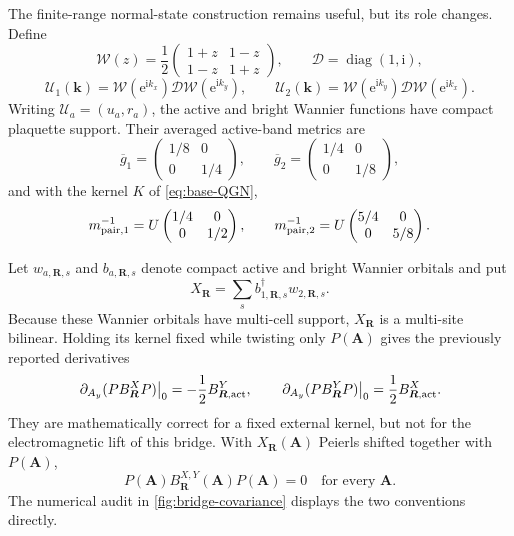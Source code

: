 \documentclass[11pt]{article}
\theoremstyle{remark}
\newcommand{\I}{\mathrm i}
\newcommand{\e}{\mathrm e}
\newcommand{\bmk}{\bm k}
\begin{document}
The finite-range normal-state construction remains useful, but its role changes.  Define
\begin{equation}
 \mathcal W(z)=\frac12
 \begin{pmatrix}1+z&1-z\\1-z&1+z\end{pmatrix},
 \qquad
 \mathcal D=\operatorname{diag}(1,\I),
\end{equation}
\begin{equation}
 \mathcal U_1(\bmk)=\mathcal W(\e^{\I k_x})\mathcal D\mathcal W(\e^{\I k_y}),
 \qquad
 \mathcal U_2(\bmk)=\mathcal W(\e^{\I k_y})\mathcal D\mathcal W(\e^{\I k_x}).
 \label{eq:compact-frames-revised}
\end{equation}
Writing $\mathcal U_a=(u_a,r_a)$, the active and bright Wannier functions have compact plaquette support.  Their averaged active-band metrics are
\begin{equation}
 \overline g_1=\begin{pmatrix}1/8&0\\0&1/4\end{pmatrix},
 \qquad
 \overline g_2=\begin{pmatrix}1/4&0\\0&1/8\end{pmatrix},
\end{equation}
and with the kernel $K$ of \cref{eq:base-QGN},
\begin{equation}
 m_{{\rm pair},1}^{-1}=U\begin{pmatrix}1/4&0\\0&1/2\end{pmatrix},
 \qquad
 m_{{\rm pair},2}^{-1}=U\begin{pmatrix}5/4&0\\0&5/8\end{pmatrix}.
 \label{eq:compact-masses-revised}
\end{equation}

Let $w_{a,\bm R,s}$ and $b_{a,\bm R,s}$ denote compact active and bright Wannier orbitals and put
\begin{equation}
 X_{\bm R}=\sum_s b_{1,\bm R,s}^\dagger w_{2,\bm R,s}.
\end{equation}
Because these Wannier orbitals have multi-cell support, $X_{\bm R}$ is a multi-site bilinear.  Holding its kernel fixed while twisting only $P(\bm A)$ gives the previously reported derivatives
\begin{equation}
 \left.\partial_{A_y}(PB_{\bm R}^XP)\right|_0=-\frac12B_{{\bm R},{\rm act}}^Y,
 \qquad
 \left.\partial_{A_y}(PB_{\bm R}^YP)\right|_0=\frac12B_{{\bm R},{\rm act}}^X.
 \label{eq:fixed-kernel-diagnostic}
\end{equation}
They are mathematically correct for a fixed external kernel, but not for the electromagnetic lift of this bridge.  With $X_{\bm R}(\bm A)$ Peierls shifted together with $P(\bm A)$,
\begin{equation}
 P(\bm A)B_{\bm R}^{X,Y}(\bm A)P(\bm A)=0
 \quad\text{for every }\bm A.
 \label{eq:compact-covariant-zero}
\end{equation}
The numerical audit in \cref{fig:bridge-covariance} displays the two conventions directly.
\end{document}
